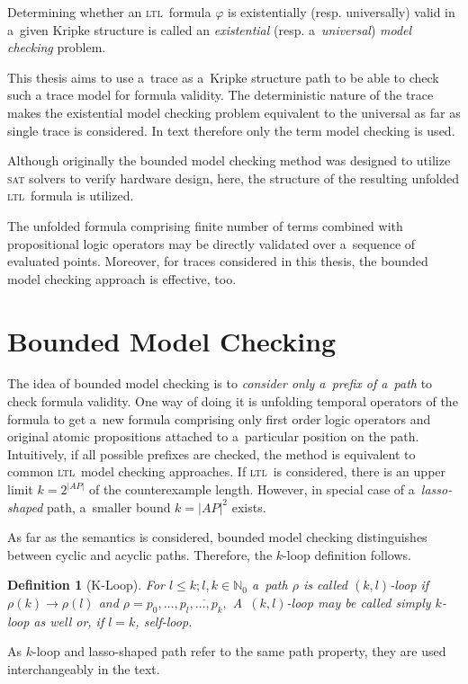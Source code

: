 \documentclass[12pt,twoside,draft]{fithesis}
\newcommand{\ltl}{\textsc{ltl}~}
\newcommand{\mNatural}{\mathbb{N}}
\newtheorem{mydef}{Definition}
\begin{document}
Determining whether an \ltl formula $\varphi$ is existentially (resp.
universally) valid in a~given Kripke structure is called an
\emph{existential} (resp. a~\emph{universal}) \emph{model checking}
problem\cite{biere}.

This thesis aims to use a~trace as a~Kripke structure path to be able
to check such a trace model for formula validity. The deterministic
nature of the trace makes the existential model checking problem
equivalent to the universal as far as single trace is considered.
In text therefore only the term model checking is used.

Although originally\cite{biere} the bounded model checking method was
designed to utilize \textsc{sat} solvers to verify hardware design,
here, the structure of the resulting unfolded \ltl formula is utilized.

The unfolded formula comprising finite number of terms combined with
propositional logic operators may be directly validated over a~sequence
of evaluated points. Moreover, for traces considered in this thesis,
the bounded model checking approach is effective, too.

\section{Bounded Model Checking}
The idea of bounded model checking is to \emph{consider only a~prefix
of a~path} to check formula validity. One way of doing it is unfolding
temporal operators of the formula to get a~new formula comprising only
first order logic operators and original atomic propositions attached
to a~particular position on the path. Intuitively, if all possible
prefixes are checked, the method is equivalent to common \ltl model
checking approaches. If \ltl is considered, there is an upper
limit $k=2^{|AP|}$ of the counterexample length\cite{biere}. However, in
special case of a~\emph{lasso-shaped} path, a~smaller bound $k={|AP|}^2$
exists\cite{biere}.

As far as the semantics is considered, bounded model checking
distinguishes between cyclic and acyclic paths. Therefore, the $k$-loop
definition follows.
\begin{mydef}[K-Loop]
For $l\leq k;l,k\in\mNatural_0$ a~path $\rho$ is called $(k,l)$-loop
if $\rho(k)\rightarrow\rho(l)$ and
$\rho=p_0,\dotsc,\overline{p_{l},\dotsc,p_{k},}$
A~$(k,l)$-loop may be called simply $k$-loop as well or, if $l=k$,
self-loop.
\end{mydef}
As $k$-loop and lasso-shaped path refer to the same path property, they
are used interchangeably in the text.
\end{document}
